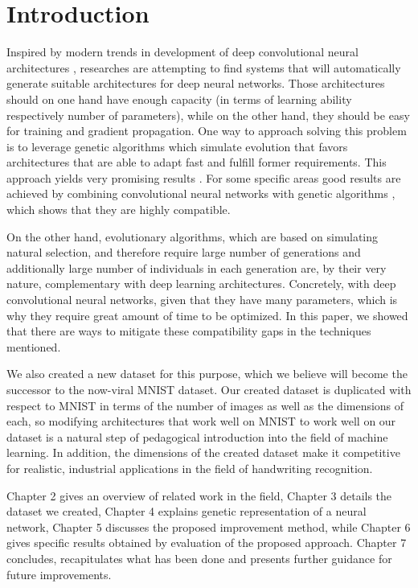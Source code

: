 \documentclass[eng]{simposium}
\begin{document}
\section{Introduction} 

Inspired by modern trends in development of deep convolutional neural architectures \cite{28,29}, researches are attempting to find 
systems that will automatically generate suitable architectures for deep neural networks. 
Those architectures should on one hand have enough capacity (in terms of learning ability respectively number of parameters), while on  
the other hand, they should be easy for training and gradient propagation. 
One way to approach solving this problem is to leverage genetic algorithms which simulate evolution that favors architectures  
that are able to adapt fast and fulfill former requirements. 
This approach yields very promising results \cite{5,30,31}.  
For some specific areas good results are achieved by combining convolutional neural networks with genetic algorithms \cite{2,32}, 
which shows that they are highly compatible.  

On the other hand, evolutionary algorithms, which are based on simulating natural selection, and therefore require large number  
of generations and additionally large number of individuals in each generation are, by their very nature, complementary with deep learning architectures. 
Concretely, with deep convolutional neural networks, given that they have many parameters, which is why they require great  
amount of time to be optimized. 
In this paper, we showed that there are ways to mitigate these compatibility gaps in the techniques mentioned. 

We also created a new dataset for this purpose, which we believe will become the successor to the now-viral MNIST dataset. 
Our created dataset is duplicated with respect to MNIST in terms of the number of images as well as the dimensions of each, 
so modifying architectures that work well on MNIST to work well on our dataset is a natural step of pedagogical introduction into the field of 
machine learning. In addition, the dimensions of the created dataset make it competitive for realistic, 
industrial applications in the field of handwriting recognition. 

Chapter 2 gives an overview of related work in the field, Chapter 3 details the dataset we created, 
Chapter 4 explains genetic representation of a neural network, 
Chapter 5 discusses the proposed improvement method, while Chapter 6 gives specific results obtained by evaluation of the proposed approach. 
Chapter 7 concludes, recapitulates what has been done and presents further guidance for future improvements. 
\end{document}
